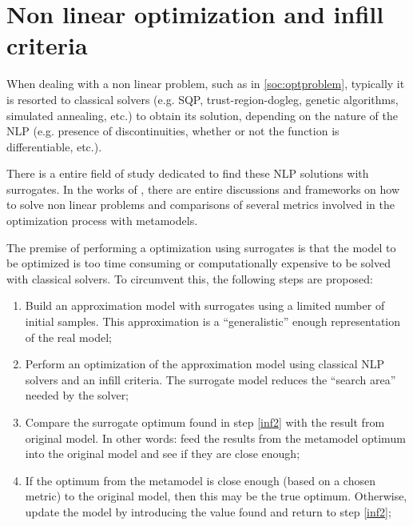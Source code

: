 \documentclass[../msc-thesis.tex]{subfiles}
\begin{document}
\chapter{Non linear optimization and infill criteria}

When dealing with a non linear problem, such as in \autoref{soc:optproblem}, 
typically it is resorted to classical solvers (e.g. SQP, trust-region-dogleg, 
genetic algorithms, simulated annealing, etc.) to obtain its solution, 
depending on the nature of the NLP (e.g. presence of discontinuities, whether 
or not the function is differentiable, etc.).

There is a entire field of study dedicated to find these NLP solutions with 
\kriging surrogates. In the works of \textcite{Jones2001, Sasena2002, 
Forrester2008, Alexandrov2000}, there are entire discussions and frameworks 
on how to solve non linear problems and comparisons of several metrics 
involved in the optimization process with metamodels.

The premise of performing a optimization using surrogates is that the model 
to be optimized is too time consuming or computationally expensive to be 
solved with classical solvers. To circumvent this, the following steps are 
proposed: 

\begin{enumerate}
    \item Build an approximation model with \kriging surrogates using a 
    limited number of initial samples. This approximation is a ``generalistic'' 
    enough representation of the real model; \label{inf2}

    \item Perform an optimization of the approximation model using classical NLP
    solvers and an infill criteria. The surrogate model reduces the 
    ``search area'' needed by the solver; \label{inf2}

    \item Compare the surrogate optimum found in step \ref{inf2} with the 
    result from original model. In other words: feed the results from the 
    \kriging metamodel optimum into the original model and see if they are 
    close enough; \label{inf3}

    \item If the optimum from the metamodel is close enough (based on a 
    chosen metric) to the original model, then this may be the true optimum. 
    Otherwise, update the \kriging model by introducing the value found and 
    return to step \ref{inf2}; \label{inf4}
    
\end{enumerate}
\end{document}
